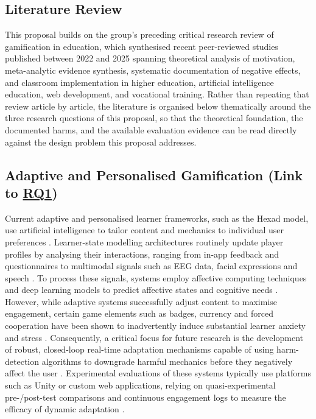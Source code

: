 \documentclass[12pt,a4paper]{article}
\DeclareRobustCommand{\rqlink}[1]{\texorpdfstring{\hyperref[rq:rq#1]{RQ#1}}{RQ#1}}
\begin{document}
\begin{justify}

\section{Literature Review}

This proposal builds on the group's preceding critical research review of gamification in education, which synthesised recent peer-reviewed studies published between 2022 and 2025 spanning theoretical analysis of motivation, meta-analytic evidence synthesis, systematic documentation of negative effects, and classroom implementation in higher education, artificial intelligence education, web development, and vocational training. Rather than repeating that review article by article, the literature is organised below thematically around the three research questions of this proposal, so that the theoretical foundation, the documented harms, and the available evaluation evidence can be read directly against the design problem this proposal addresses.

\subsection{Adaptive and Personalised Gamification (Link to \rqlink{1})}

Current adaptive and personalised learner frameworks, such as the Hexad model, use
artificial intelligence to tailor content and mechanics to individual user preferences
\parencite{zourmpakis2023adaptive,vistorte2024integrating}. Learner-state
modelling architectures routinely update player profiles by analysing their
interactions, ranging from in-app feedback and questionnaires to multimodal signals
such as EEG data, facial expressions and speech
\parencite{zourmpakis2023adaptive,vistorte2024integrating}. To process these signals,
systems employ affective computing techniques and deep learning models to predict
affective states and cognitive needs
\parencite{vistorte2024integrating,zourmpakis2023adaptive}. However, while adaptive
systems successfully adjust content to maximise engagement, certain game elements such
as badges, currency and forced cooperation have been shown to inadvertently induce
substantial learner anxiety and stress \parencite{zourmpakis2023adaptive}.
Consequently, a critical focus for future research is the development of robust,
closed-loop real-time adaptation mechanisms capable of using harm-detection algorithms
to downgrade harmful mechanics before they negatively affect the user
\parencite{zourmpakis2023adaptive,farhan2023machine}. Experimental evaluations of
these systems typically use platforms such as Unity or custom web applications,
relying on quasi-experimental pre-/post-test comparisons and continuous engagement
logs to measure the efficacy of dynamic adaptation
\parencite{zourmpakis2023adaptive,shabadurai2025reinforcement,naseer2025game}.



\end{justify}
\end{document}
